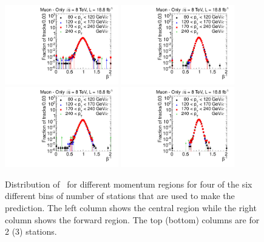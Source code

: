 \begin{figure}
\begin{center}
\includegraphics[clip=true, trim=0.0cm 0cm 3.0cm 0cm,width=0.44\textwidth]{figures/muonly/Control_Data8TeV_Pt_TOFSpectrum_Binned_0}
\includegraphics[clip=true, trim=0.0cm 0cm 3.0cm 0cm,width=0.44\textwidth]{figures/muonly/Control_Data8TeV_Pt_TOFSpectrum_Binned_3} \\
\includegraphics[clip=true, trim=0.0cm 0cm 3.0cm 0cm,width=0.44\textwidth]{figures/muonly/Control_Data8TeV_Pt_TOFSpectrum_Binned_1}
\includegraphics[clip=true, trim=0.0cm 0cm 3.0cm 0cm,width=0.44\textwidth]{figures/muonly/Control_Data8TeV_Pt_TOFSpectrum_Binned_4}
\caption{Distribution of \invbeta\ 
for different momentum regions for four of the
six different bins of number of stations that are used to make
the prediction.
The left column shows the central region while the right column
shows the forward region.  The top (bottom) columns are for 2 (3) stations.
\label{fig:MuOnlyControl}}
\end{center}
\end{figure}


